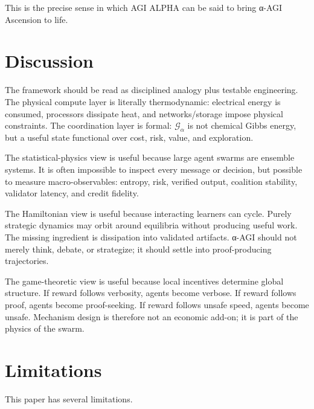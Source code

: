 This is the precise sense in which AGI ALPHA can be said to bring α-AGI
Ascension to life.

\section{Discussion}\label{discussion}

The framework should be read as disciplined analogy plus testable
engineering. The physical compute layer is literally thermodynamic:
electrical energy is consumed, processors dissipate heat, and
networks/storage impose physical constraints. The coordination layer is
formal: \(\mathcal{G}_{\alpha}\) is not chemical Gibbs energy, but a
useful state functional over cost, risk, value, and exploration.

The statistical-physics view is useful because large agent swarms are
ensemble systems. It is often impossible to inspect every message or
decision, but possible to measure macro-observables: entropy, risk,
verified output, coalition stability, validator latency, and credit
fidelity.

The Hamiltonian view is useful because interacting learners can cycle.
Purely strategic dynamics may orbit around equilibria without producing
useful work. The missing ingredient is dissipation into validated
artifacts. α-AGI should not merely think, debate, or strategize; it
should settle into proof-producing trajectories.

The game-theoretic view is useful because local incentives determine
global structure. If reward follows verbosity, agents become verbose. If
reward follows proof, agents become proof-seeking. If reward follows
unsafe speed, agents become unsafe. Mechanism design is therefore not an
economic add-on; it is part of the physics of the swarm.

\section{Limitations}\label{limitations}

This paper has several limitations.

